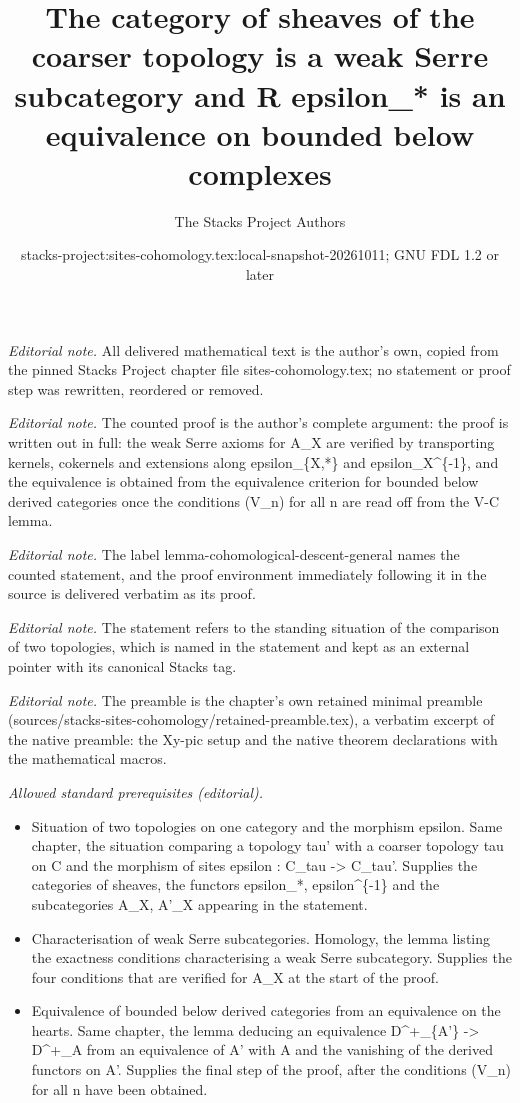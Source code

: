 \documentclass[10pt,a4paper]{amsart}
\title{The category of sheaves of the coarser topology is a weak Serre subcategory and R epsilon\_* is an equivalence on bounded below complexes}
\author{The Stacks Project Authors}
\date{stacks-project:sites-cohomology.tex:local-snapshot-20261011; GNU FDL 1.2 or later}
\theoremstyle{plain}
\theoremstyle{definition}
\theoremstyle{remark}
\numberwithin{equation}{subsection}
\begin{document}
\maketitle
\noindent\textit{Editorial note.} All delivered mathematical text is the author's own, copied from the pinned Stacks Project chapter file sites-cohomology.tex; no statement or proof step was rewritten, reordered or removed.\par\medskip
\noindent\textit{Editorial note.} The counted proof is the author's complete argument: the proof is written out in full: the weak Serre axioms for A\_X are verified by transporting kernels, cokernels and extensions along epsilon\_\{X,*\} and epsilon\_X\textasciicircum{}\{-1\}, and the equivalence is obtained from the equivalence criterion for bounded below derived categories once the conditions (V\_n) for all n are read off from the V-C lemma.\par\medskip
\noindent\textit{Editorial note.} The label lemma-cohomological-descent-general names the counted statement, and the proof environment immediately following it in the source is delivered verbatim as its proof.\par\medskip
\noindent\textit{Editorial note.} The statement refers to the standing situation of the comparison of two topologies, which is named in the statement and kept as an external pointer with its canonical Stacks tag.\par\medskip
\noindent\textit{Editorial note.} The preamble is the chapter's own retained minimal preamble (sources/stacks-sites-cohomology/retained-preamble.tex), a verbatim excerpt of the native preamble: the Xy-pic setup and the native theorem declarations with the mathematical macros.\par\medskip
\noindent\textit{Allowed standard prerequisites (editorial).}\begin{itemize}
\item Situation of two topologies on one category and the morphism epsilon. Same chapter, the situation comparing a topology tau' with a coarser topology tau on C and the morphism of sites epsilon : C\_tau -> C\_tau'. Supplies the categories of sheaves, the functors epsilon\_*, epsilon\textasciicircum{}\{-1\} and the subcategories A\_X, A'\_X appearing in the statement.
\item Characterisation of weak Serre subcategories. Homology, the lemma listing the exactness conditions characterising a weak Serre subcategory. Supplies the four conditions that are verified for A\_X at the start of the proof.
\item Equivalence of bounded below derived categories from an equivalence on the hearts. Same chapter, the lemma deducing an equivalence D\textasciicircum{}+\_\{A'\} -> D\textasciicircum{}+\_A from an equivalence of A' with A and the vanishing of the derived functors on A'. Supplies the final step of the proof, after the conditions (V\_n) for all n have been obtained.
\end{itemize}\medskip
\end{document}
